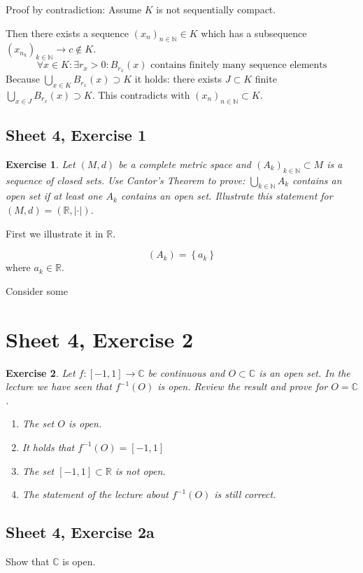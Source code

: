 \documentclass{article}
\newtheorem{ex}{Exercise} %
\newcommand{\set}[1]{\left\{#1\right\}}
\newcommand{\card}[1]{\left|#1\right|}
\begin{document}
Proof by contradiction: Assume $K$ is not sequentially compact.

Then there exists a sequence $(x_n)_{n \in \mathbb N} \in K$ which has a subsequence $(x_{n_k})_{k \in \mathbb N} \to c \not\in K$.
\[ \forall x \in K: \exists r_x > 0: B_{r_x}(x) \text{ contains finitely many sequence elements} \]
Because $\bigcup_{x \in K} B_{r_x}(x) \supset K$ it holds: there exists $J \subset K$ finite $\bigcup_{x \in J} B_{r_x}(x) \supset K$.
This contradicts with $(x_n)_{n \in \mathbb N} \subset K$.

\subsection{Sheet 4, Exercise 1}
\begin{ex}
  Let $(M,d)$ be a complete metric space and $(A_k)_{k \in \mathbb N} \subset M$
  is a sequence of closed sets. Use Cantor's Theorem to prove:
  $\bigcup_{k \in \mathbb N} A_k$ contains an open set if at least one $A_k$
  contains an open set. Illustrate this statement for $(M,d) = (\mathbb R, \card{\cdot})$.
\end{ex}

First we illustrate it in $\mathbb R$.

\[ (A_k) = \set{a_k} \]
where $a_k \in \mathbb R$.

Consider some 

\section{Sheet 4, Exercise 2}
\begin{ex}
  Let $f: [-1,1] \to \mathbb C$ be continuous and $O \subset \mathbb C$ is an open set.
  In the lecture we have seen that $f^{-1}(O)$ is open.
  Review the result and prove for $O = \mathbb C$.
  \begin{enumerate}
    \item The set $O$ is open.
    \item It holds that $f^{-1}(O) = [-1,1]$
    \item The set $[-1,1] \subset \mathbb R$ is not open.
    \item The statement of the lecture about $f^{-1}(O)$ is still correct.
  \end{enumerate}
\end{ex}

\subsection{Sheet 4, Exercise 2a}
Show that $\mathbb C$ is open.
\end{document}
